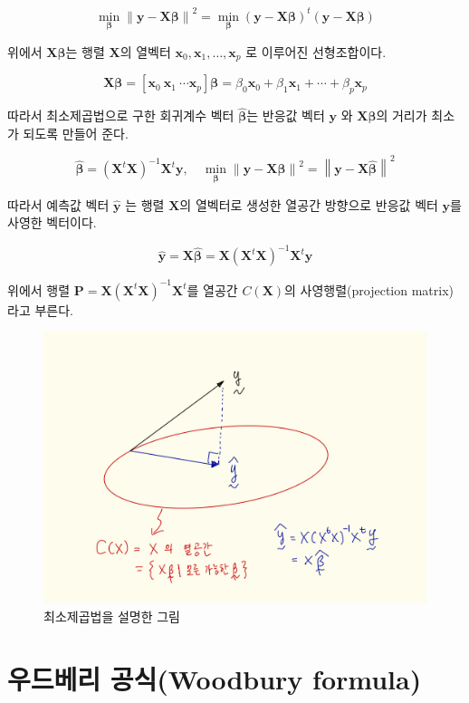 \documentclass[
]{book}
\newcommand{\norm}[1]{\left\lVert#1\right\rVert}
\theoremstyle{definition}
\theoremstyle{definition}
\theoremstyle{definition}
\theoremstyle{definition}
\theoremstyle{remark}
\begin{document}
\[   \min_{\bm \beta } \norm{\bm y -  \bm X \bm \beta }^2= \min_{\bm \beta } ( \bm y -  \bm X \bm \beta )^t( \bm y -  \bm X \bm \beta )  \]

위에서 \(\bm X \bm \beta\)는 행렬 \(\bm X\)의 열벡터 \(\bm x_0, \bm x_1, \dots, \bm x_p\) 로 이루어진 선형조합이다.

\[ \bm X \bm \beta = [\bm x_0~\bm x_1~ \cdots \bm x_p]\bm \beta
 = \beta_0 \bm x_0  + \beta_1 \bm x_1 + \cdots + \beta_p \bm x_p \]

따라서 최소제곱법으로 구한 회귀계수 벡터 \(\hat {\bm \beta}\)는 반응값 벡터 \(\bm y\) 와 \(\bm X {\bm \beta}\)의 거리가 최소가 되도록 만들어 준다.

\[ \hat {\bm \beta} = (\bm X^t \bm X)^{-1} \bm X^t \bm y, \quad 
 \min_{\bm \beta } \norm{\bm y -  \bm X \bm \beta }^2 = \norm{\bm y -  \bm X \hat {\bm \beta} }^2
 \]

따라서 예측값 벡터 \(\hat {\bm y}\) 는 행렬 \(\bm X\)의 열벡터로 생성한 열공간 방향으로 반응값 벡터 \(\bm y\)를 사영한 벡터이다.

\[ \hat {\bm y} = \bm X \hat {\bm \beta} = \bm  X(\bm X^t \bm X)^{-1} \bm X^t \bm y \]

위에서 행렬 \(\bm P = \bm X(\bm X^t \bm X)^{-1} \bm X^t\)를 열공간 \(C(\bm X)\)의 사영행렬(projection matrix)라고 부른다.

\begin{figure}
\centering
\includegraphics{proj2.png}
\caption{최소제곱법을 설명한 그림}
\end{figure}

\hypertarget{uxc6b0uxb4dcuxbca0uxb9ac-uxacf5uxc2ddwoodbury-formula}{%
\section{우드베리 공식(Woodbury formula)}\label{uxc6b0uxb4dcuxbca0uxb9ac-uxacf5uxc2ddwoodbury-formula}}
\end{document}
